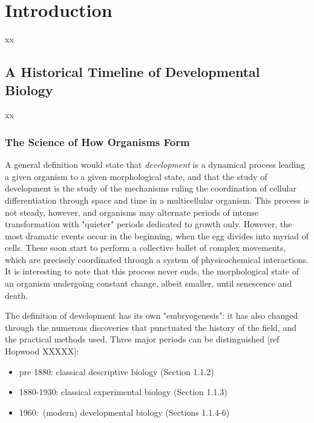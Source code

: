 


\section{Introduction}


xx


\subsection{A Historical Timeline of Developmental Biology }


xx


\subsubsection{The Science of How Organisms Form}


A general definition would state that \textit{development} is a dynamical process leading a given organism to a given morphological state, and that the study of development is the study of the mechanisms ruling the coordination of cellular differentiation through space and time in a multicellular organism. This process is not steady, however, and organisms may alternate periods of intense transformation with "quieter" periods dedicated to growth only. However, the most dramatic events occur in the beginning, when the egg divides into myriad of cells. These soon start to perform a collective ballet of complex movements, which are precisely coordinated through a system of physicochemical interactions. It is interesting to note that this process never ends, the morphological state of an organism undergoing constant change, albeit smaller, until senescence and death.

The definition of development has its own "embryogenesis": it has also changed through the numerous discoveries that punctuated the history of the field, and the practical methods used. Three major periods can be distinguished [ref Hopwood XXXXX]:
\begin{itemize}
	\item pre 1880: classical descriptive biology (Section 1.1.2)
	\item 1880-1930: classical experimental biology (Section 1.1.3)
	\item 1960: (modern) developmental biology (Sections 1.1.4-6)
\end{itemize}


